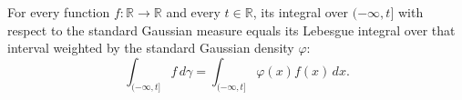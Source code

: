 \begin{lemma}
\label{BooleanAnalysis.GaussianSpace.integral_Iic_standardGaussianMeasure}
\leanok
{}
For every function $f:\mathbb R\to\mathbb R$ and every $t\in\mathbb R$, its integral
over $(-\infty,t]$ with respect to the standard Gaussian measure equals its Lebesgue
integral over that interval weighted by the standard Gaussian density $\varphi$:
\[\int_{(-\infty,t]} f\,d\gamma=\int_{(-\infty,t]}\varphi(x)f(x)\,dx.\]
\end{lemma}
